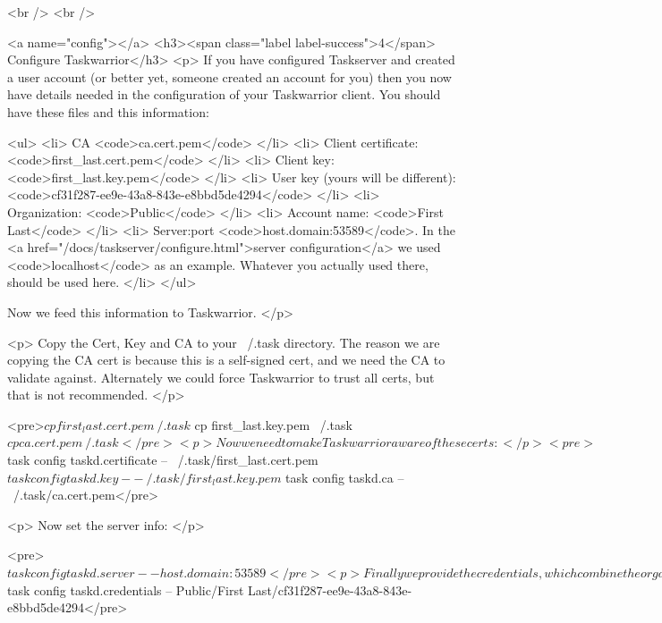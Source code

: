 \documentclass[t,handout]{beamer}
\begin{document}
<br />
<br />


<a name="config"></a>
<h3><span class="label label-success">4</span> Configure Taskwarrior</h3>
<p>
  If you have configured Taskserver and created a user account (or
  better yet, someone created an account for you) then you now have
  details needed in the configuration of your Taskwarrior client.
  You should have these files and this information:

  <ul>
    <li>
      CA <code>ca.cert.pem</code>
    </li>
    <li>
      Client certificate: <code>first_last.cert.pem</code>
    </li>
    <li>
      Client key: <code>first_last.key.pem</code>
    </li>
    <li>
      User key (yours will be different): <code>cf31f287-ee9e-43a8-843e-e8bbd5de4294</code>
    </li>
    <li>
      Organization: <code>Public</code>
    </li>
    <li>
      Account name: <code>First Last</code>
    </li>
    <li>
      Server:port <code>host.domain:53589</code>.
      In the
      <a href="/docs/taskserver/configure.html">server configuration</a>
      we used <code>localhost</code> as an example. Whatever you
      actually used there, should be used here.
    </li>
  </ul>

  Now we feed this information to Taskwarrior.
</p>

<p>
  Copy the Cert, Key and CA to your ~/.task directory.  The reason
  we are copying the CA cert is because this is a self-signed cert,
  and we need the CA to validate against.  Alternately we could
  force Taskwarrior to trust all certs, but that is not recommended.
</p>

<pre>$ cp first_last.cert.pem ~/.task
$ cp first_last.key.pem  ~/.task
$ cp ca.cert.pem         ~/.task</pre>

<p>
  Now we need to make Taskwarrior aware of these certs:
</p>

<pre>$ task config taskd.certificate -- ~/.task/first_last.cert.pem
$ task config taskd.key         -- ~/.task/first_last.key.pem
$ task config taskd.ca          -- ~/.task/ca.cert.pem</pre>

<p>
  Now set the server info:
</p>

<pre>$ task config taskd.server      -- host.domain:53589</pre>

<p>
  Finally we provide the credentials, which combine the
  organization, account name and user key:
</p>

<pre>$ task config taskd.credentials -- Public/First Last/cf31f287-ee9e-43a8-843e-e8bbd5de4294</pre>
\end{document}
